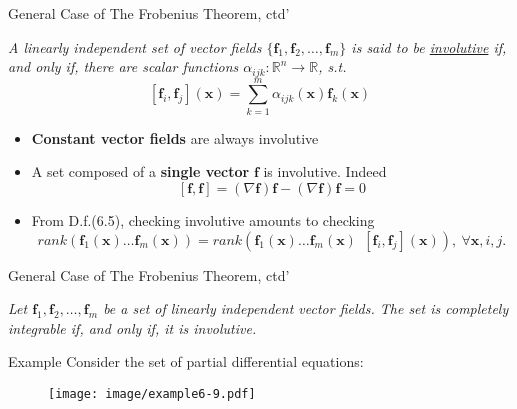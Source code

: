 \documentclass{beamer}
\renewcommand{\vec}[1]{\ensuremath{\boldsymbol{#1}}} %
\begin{document}
\begin{frame}{General Case of The Frobenius Theorem, ctd'}
\begin{definition}[6.5]
    \textit{
    A linearly independent set of vector fields $ \{ \vec{f}_{1}, \vec{f}_{2}, \dots, \vec{f}_{m} \} $ is said to be \underline{involutive} if, and only if, there are scalar functions $\alpha_{ijk} : \mathbb{R}^{n} \rightarrow \mathbb{R} $, s.t.
    \vspace{-10pt}
        \begin{equation}\label{involutive-equation}
          [\vec{f}_{i}, \vec{f}_{j}](\vec{x}) = \sum_{k=1}^{m}\alpha_{ijk}(\vec{x})\vec{f}_{k}(\vec{x})
        \end{equation}
    }
\end{definition}
\vspace{-30pt}
\begin{itemize}
  \item \textbf{Constant vector fields} are always involutive
  \item A set composed of a \textbf{single vector} \vec{f} is involutive. Indeed
  $$
  [\vec{f},\vec{f}] = (\nabla \vec{f})\vec{f} - (\nabla \vec{f})\vec{f} = 0
  $$
  \item From D.f.(6.5), checking involutive amounts to checking
  $$
  rank(\vec{f}_{1}(\vec{x}) \dots \vec{f}_{m}(\vec{x})) = rank(\vec{f}_{1}(\vec{x}) \dots \vec{f}_{m}(\vec{x}) ~~ [\vec{f}_{i}, \vec{f}_{j}](\vec{x})),~ \forall \vec{x},i,j.
  $$
\end{itemize}
\end{frame}


\begin{frame}{General Case of The Frobenius Theorem, ctd'}
    \begin{theorem}[6.1 Frobenius]
    \textit{
      Let $\vec{f}_{1}, \vec{f}_{2}, \dots, \vec{f}_{m}$ be a set of linearly independent vector fields. The set is {\color{red}completely integrable} if, and only if, it is {\color{red}involutive}.
    }
\end{theorem}
\end{frame}


\begin{frame}{Example}
Consider the set of partial differential equations:
\vspace{-20pt}
    \begin{figure}
      \centering
      \texttt{[image: image/example6-9.pdf]}
    \end{figure}
\end{frame}
\end{document}
